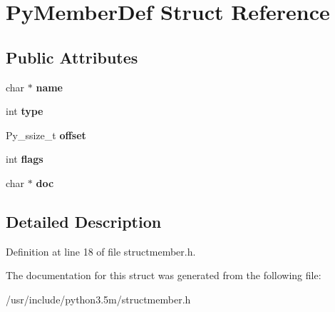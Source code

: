 \hypertarget{structPyMemberDef}{}\section{Py\+Member\+Def Struct Reference}
\label{structPyMemberDef}
\subsection*{Public Attributes}
\begin{DoxyCompactItemize}
\item 
char $\ast$ {\bfseries name}\hypertarget{structPyMemberDef_a20cf4c6ed77b26a0d87fc718a02aad35}{}\label{structPyMemberDef_a20cf4c6ed77b26a0d87fc718a02aad35}

\item 
int {\bfseries type}\hypertarget{structPyMemberDef_ac76ca02c4307d56613dee98c198e569f}{}\label{structPyMemberDef_ac76ca02c4307d56613dee98c198e569f}

\item 
Py\+\_\+ssize\+\_\+t {\bfseries offset}\hypertarget{structPyMemberDef_a78c440b432b027928ec9a7c88cff74d7}{}\label{structPyMemberDef_a78c440b432b027928ec9a7c88cff74d7}

\item 
int {\bfseries flags}\hypertarget{structPyMemberDef_a1579e768952c3350fe8510f164cea15d}{}\label{structPyMemberDef_a1579e768952c3350fe8510f164cea15d}

\item 
char $\ast$ {\bfseries doc}\hypertarget{structPyMemberDef_a52eba722acb02c6745ea662056a1479c}{}\label{structPyMemberDef_a52eba722acb02c6745ea662056a1479c}

\end{DoxyCompactItemize}


\subsection{Detailed Description}


Definition at line 18 of file structmember.\+h.



The documentation for this struct was generated from the following file\+:\begin{DoxyCompactItemize}
\item 
/usr/include/python3.\+5m/structmember.\+h\end{DoxyCompactItemize}
